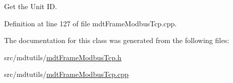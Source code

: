 Get the Unit I\-D. 



Definition at line 127 of file mdt\-Frame\-Modbus\-Tcp.\-cpp.



The documentation for this class was generated from the following files\-:\begin{DoxyCompactItemize}
\item 
src/mdtutils/\hyperlink{mdt_frame_modbus_tcp_8h}{mdt\-Frame\-Modbus\-Tcp.\-h}\item 
src/mdtutils/\hyperlink{mdt_frame_modbus_tcp_8cpp}{mdt\-Frame\-Modbus\-Tcp.\-cpp}\end{DoxyCompactItemize}
